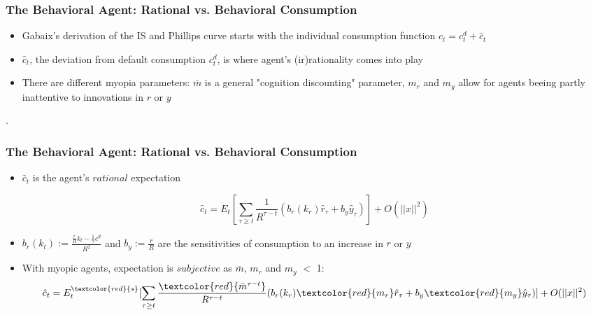 \documentclass{beamer}
\begin{document}

\begin{frame}
	\frametitle{The Behavioral Agent: Rational vs. Behavioral Consumption}
	\begin{itemize}
		\item Gabaix's derivation of the IS and Phillips curve starts with the individual consumption function $c_{t}=c_{t}^{d}+\hat c_{t}$
		\item  $\hat c_{t}$, the deviation from default consumption $c_{t}^{d}$, is where agent's (ir)rationality comes into play
		\item There are different myopia parameters: $\bar m$ is a general "cognition discounting" parameter, $m_{r}$ and $m_{y}$ allow for agents beeing partly inattentive to innovations in $r$ or $y$
	\end{itemize}.
\end{frame}


\begin{frame}
	\frametitle{The Behavioral Agent: Rational vs. Behavioral Consumption}
	\begin{itemize}
		\item $\hat c_{t}$ is the agent's $rational$ expectation 

		$$\hat c_{t}=E_{t}[\sum_{\tau \geq t}\frac{1}{R^{\tau-t}}(b_{r}(k_{r})\hat r_{\tau}+b_{y}\hat y_{\tau})]+O(||x||^2)$$
		\item  $b_{r}(k_{t}):=\frac {\frac {r}{R}k_{t}-\frac {1}{\gamma}c^{d}}{R^{2}}$ and $b_{y}:=\frac {r}{R}$ are the sensitivities of consumption to an increase in $r$ or $y$
		\item With myopic agents, expectation is $subjective$ as $\bar m$, $m_{r}$ and $m_{y}$  $<$ 1: $$\hat c_{t}=E_{t}^{\textcolor{red}{s}}[\sum_{\tau \geq t}\frac{\textcolor{red}{\bar m^{\tau-t}}}{R^{\tau-t}}(b_{r}(k_{r})\textcolor{red}{m_{r}}\hat r_{\tau}+b_{y}\textcolor{red}{m_{y}}\hat y_{\tau})]+O(||x||^2)$$
	\end{itemize}
\end{frame}

\end{document}
